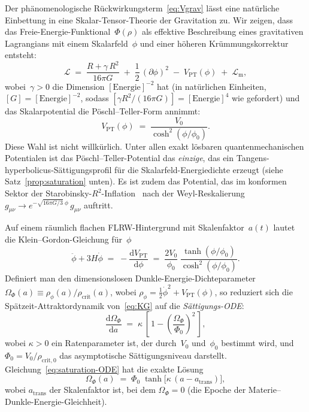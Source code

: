 \documentclass[12pt,a4paper]{article}
\theoremstyle{definition}
\theoremstyle{plain}
\theoremstyle{remark}
\newcommand{\dd}{\mathrm{d}}
\begin{document}
Der ph\"anomenologische R\"uckwirkungsterm~\eqref{eq:Vgrav} l\"asst
eine nat\"urliche Einbettung in eine Skalar-Tensor-Theorie der
Gravitation zu. Wir zeigen, dass das
Freie-Energie-Funktional~$\Phi(\rho)$ als effektive Beschreibung
eines gravitativen Lagrangians mit einem Skalarfeld~$\phi$ und einer
h\"oheren Kr\"ummungskorrektur entsteht:
\begin{equation}\label{eq:Lagrangian}
  \mathcal{L} \;=\;
  \frac{R + \gamma\,R^{2}}{16\pi G}
  \;+\; \frac{1}{2}\,(\partial\phi)^{2}
  \;-\; V_{\mathrm{PT}}(\phi)
  \;+\; \mathcal{L}_{\mathrm{m}},
\end{equation}
wobei~$\gamma > 0$ die Dimension $[\mathrm{Energie}]^{-2}$ hat (in nat\"urlichen Einheiten, $[G] = [\mathrm{Energie}]^{-2}$, sodass $[\gamma R^2/(16\pi G)] = [\mathrm{Energie}]^4$ wie gefordert) und das
Skalarpotential die P\"oschl--Teller-Form annimmt:
\begin{equation}\label{eq:VPT}
  V_{\mathrm{PT}}(\phi) \;=\;
  \frac{V_{0}}{\cosh^{2}(\phi/\phi_{0})}.
\end{equation}
Diese Wahl ist nicht willk\"urlich. Unter allen exakt l\"osbaren
quantenmechanischen Potentialen ist das P\"oschl--Teller-Potential das
\emph{einzige}, das ein Tangens-hyperbolicus-S\"attigungsprofil f\"ur
die Skalarfeld-Energiedichte erzeugt (siehe
Satz~\ref{prop:saturation} unten). Es ist zudem das Potential, das im
konformen Sektor der Starobinsky-$R^{2}$-Inflation~\cite{Starobinsky1980}
nach der Weyl-Reskalierung
$g_{\mu\nu} \to e^{-\sqrt{16\pi G/3}\;\phi}\,g_{\mu\nu}$ auftritt.

\medskip
Auf einem r\"aumlich flachen FLRW-Hintergrund mit Skalenfaktor~$a(t)$
lautet die Klein--Gordon-Gleichung f\"ur~$\phi$
\begin{equation}\label{eq:KG}
  \ddot{\phi} + 3H\dot{\phi}
  \;=\; -\frac{\dd V_{\mathrm{PT}}}{\dd\phi}
  \;=\; \frac{2V_{0}}{\phi_{0}}\;
  \frac{\tanh(\phi/\phi_{0})}{\cosh^{2}(\phi/\phi_{0})}.
\end{equation}
Definiert man den dimensionslosen Dunkle-Energie-Dichteparameter
$\Omega_{\Phi}(a) \equiv \rho_{\phi}(a)/\rho_{\mathrm{crit}}(a)$,
wobei $\rho_{\phi} = \tfrac{1}{2}\dot{\phi}^{2} + V_{\mathrm{PT}}(\phi)$,
so reduziert sich die Sp\"atzeit-Attraktordynamik von~\eqref{eq:KG}
auf die \emph{S\"attigungs-ODE}:
\begin{equation}\label{eq:saturation-ODE}
  \frac{\dd\Omega_{\Phi}}{\dd a}
  \;=\; \kappa\,
  \left[\,
    1 - \left(\frac{\Omega_{\Phi}}{\Phi_{0}}\right)^{\!2}
  \,\right],
\end{equation}
wobei $\kappa > 0$ ein Ratenparameter ist, der durch~$V_{0}$
und~$\phi_{0}$ bestimmt wird, und $\Phi_{0} = V_{0}/\rho_{\mathrm{crit},0}$
das asymptotische S\"attigungsniveau darstellt.
Gleichung~\eqref{eq:saturation-ODE} hat die exakte L\"osung
\begin{equation}\label{eq:tanh-solution}
  \Omega_{\Phi}(a) \;=\;
  \Phi_{0}\;\tanh\!\bigl[\kappa\,(a - a_{\mathrm{trans}})\bigr],
\end{equation}
wobei $a_{\mathrm{trans}}$ der Skalenfaktor ist, bei dem
$\Omega_{\Phi} = 0$ (die Epoche der Materie--Dunkle-Energie-Gleichheit).
\end{document}
